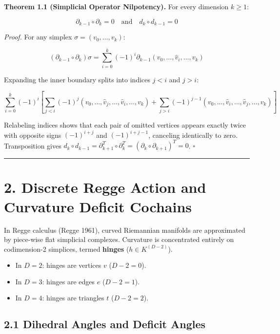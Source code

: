 \documentclass[11pt]{article}
\begin{document}
\textbf{Theorem 1.1 (Simplicial Operator Nilpotency).} For every dimension $k \ge 1$:

\begin{equation*}
\partial_{k-1} \circ \partial_k = 0 \quad \text{and} \quad d_k \circ d_{k-1} = 0
\end{equation*}

\emph{Proof.} For any simplex $\sigma = (v_0, \dots, v_k)$:

\begin{equation*}
(\partial_{k-1} \circ \partial_k) \sigma = \sum_{i=0}^k (-1)^i \partial_{k-1} (v_0, \dots, \hat{v}_i, \dots, v_k)
\end{equation*}

Expanding the inner boundary splits into indices $j < i$ and $j > i$:

\begin{equation*}
\sum_{i=0}^k (-1)^i \left[ \sum_{j < i} (-1)^j (v_0, \dots, \hat{v}_j, \dots, \hat{v}_i, \dots, v_k) + \sum_{j > i} (-1)^{j-1} (v_0, \dots, \hat{v}_i, \dots, \hat{v}_j, \dots, v_k) \right]
\end{equation*}

Relabeling indices shows that each pair of omitted vertices appears exactly twice with opposite signs $(-1)^{i+j}$ and $(-1)^{i+j-1}$, canceling identically to zero. Transposition gives $d_k \circ d_{k-1} = \partial_{k+1}^T \circ \partial_k^T = (\partial_k \circ \partial_{k+1})^T = 0$. $\square$

\medskip\hrule\medskip
\section{\texorpdfstring{2. Discrete Regge Action and Curvature Deficit Cochains}{2. Discrete Regge Action and Curvature Deficit Cochains}}

In Regge calculus (Regge 1961), curved Riemannian manifolds are approximated by piece-wise flat simplicial complexes. Curvature is concentrated entirely on codimension-2 simplices, termed \textbf{hinges} ($h \in K^{(D-2)}$).

\begin{itemize}[leftmargin=1.4em,itemsep=0.2em]
\item In $D=2$: hinges are vertices $v$ ($D-2 = 0$).
\item In $D=3$: hinges are edges $e$ ($D-2 = 1$).
\item In $D=4$: hinges are triangles $t$ ($D-2 = 2$).
\end{itemize}
\subsection{\texorpdfstring{2.1 Dihedral Angles and Deficit Angles}{2.1 Dihedral Angles and Deficit Angles}}
\end{document}
